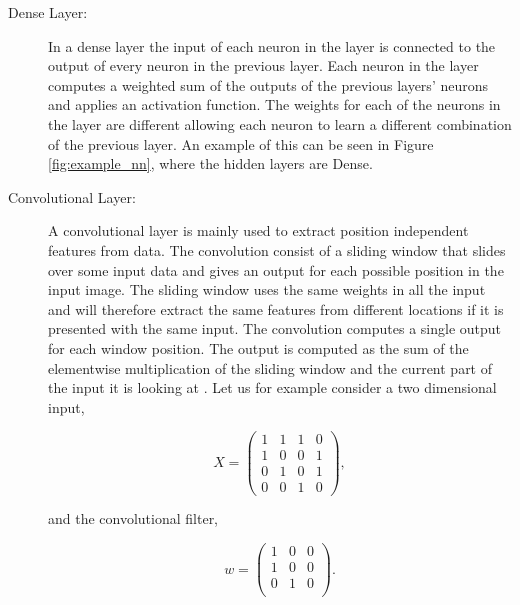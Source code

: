 \begin{description}

    \item[Dense Layer:]

        In a dense layer the input of each neuron in the layer is connected to
        the output of every neuron in the previous layer. Each neuron in the
        layer computes a weighted sum of the outputs of the previous layers'
        neurons and applies an activation function. The weights for each of
        the neurons in the layer are different allowing each neuron to learn a
        different combination of the previous layer. An example of this can be
        seen in Figure \ref{fig:example_nn}, where the hidden layers are Dense.

    \item[Convolutional Layer:]

        A convolutional layer is mainly used to extract position independent
        features from data. The convolution consist of a sliding window that
        slides over some input data and gives an output for each possible
        position in the input image. The sliding window uses the same weights
        in all the input and will therefore extract the same features from
        different locations if it is presented with the same input. The
        convolution computes a single output for each window position. The
        output is computed as the sum of the elementwise multiplication of
        the sliding window and the current part of the input it is looking at
        \citep{oshea2015}. Let us for example consider a two dimensional input,

        \begin{equation}
            X = \begin{pmatrix}
                1 & 1 & 1 & 0 \\
                1 & 0 & 0 & 1 \\
                0 & 1 & 0 & 1 \\
                0 & 0 & 1 & 0
            \end{pmatrix},
        \end{equation}

        and the convolutional filter,

        \begin{equation}
            w = \begin{pmatrix}
                1 & 0 & 0 \\
                1 & 0 & 0 \\
                0 & 1 & 0 \\
            \end{pmatrix}.
        \end{equation}


\end{description}
